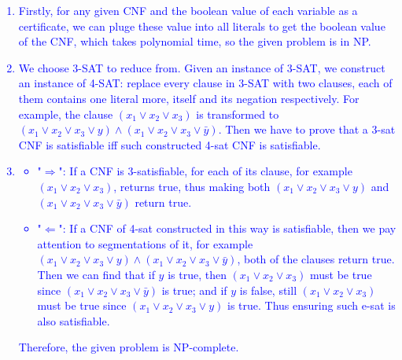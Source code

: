 \documentclass{article}
\begin{document}
\textcolor{blue}{
	\begin{enumerate}
		\item Firstly, for any given CNF and the boolean value of each variable as a certificate, we can pluge these value into all literals to get the boolean value of the CNF, which takes polynomial time, so the given problem is in NP.
		\item We choose 3-SAT to reduce from. Given an instance of 3-SAT, we construct an instance of 4-SAT: replace every clause in 3-SAT with two clauses, each of them contains one literal more, itself and its negation respectively. For example, the clause $(x_1\vee x_2\vee x_3)$ is transformed to $(x_1\vee x_2\vee x_3\vee y)\wedge (x_1\vee x_2\vee x_3\vee \bar{y})$. Then we have to prove that a 3-sat CNF is satisfiable iff such constructed 4-sat CNF is satisfiable.
		\item \begin{itemize}
			\item "$\Rightarrow$": If a CNF is 3-satisfiable, for each of its clause, for example $(x_1\vee x_2\vee x_3)$, returns true, thus making both $(x_1\vee x_2\vee x_3\vee y)$ and $(x_1\vee x_2\vee x_3\vee \bar{y})$ return true.
			\item "$\Leftarrow$": If a CNF of 4-sat constructed in this way is satisfiable, then we pay attention to segmentations of it, for example $(x_1\vee x_2\vee x_3\vee y)\wedge (x_1\vee x_2\vee x_3\vee \bar{y})$, both of the clauses return true. Then we can find that if $y$ is true, then $(x_1\vee x_2\vee x_3)$ must be true since $(x_1\vee x_2\vee x_3\vee \bar{y})$ is true; and if $y$ is false, still $(x_1\vee x_2\vee x_3)$ must be true since $(x_1\vee x_2\vee x_3\vee y)$ is true. Thus ensuring such e-sat is also satisfiable.
		\end{itemize}
		Therefore, the given problem is NP-complete.
	\end{enumerate}
}
\end{document}
